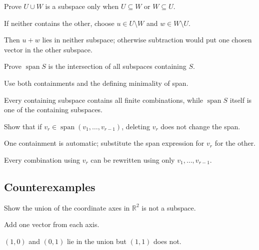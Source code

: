 \begin{exercise}\label{exr:i02-expand-07}
Prove \(U\cup W\) is a subspace only when \(U\subseteq W\) or \(W\subseteq U\).
\end{exercise}
\begin{hint}
If neither contains the other, choose \(u\in U\setminus W\) and \(w\in W\setminus U\).
\end{hint}
\begin{solution}
Then \(u+w\) lies in neither subspace; otherwise subtraction would put one chosen vector in the other subspace.
\end{solution}

\begin{exercise}\label{exr:i02-expand-08}
Prove \(\operatorname{span}S\) is the intersection of all subspaces containing \(S\).
\end{exercise}
\begin{hint}
Use both containments and the defining minimality of span.
\end{hint}
\begin{solution}
Every containing subspace contains all finite combinations, while \(\operatorname{span}S\) itself is one of the containing subspaces.
\end{solution}

\begin{exercise}\label{exr:i02-expand-09}
Show that if \(v_r\in\operatorname{span}(v_1,\ldots,v_{r-1})\), deleting \(v_r\) does not change the span.
\end{exercise}
\begin{hint}
One containment is automatic; substitute the span expression for \(v_r\) for the other.
\end{hint}
\begin{solution}
Every combination using \(v_r\) can be rewritten using only \(v_1,\ldots,v_{r-1}\).
\end{solution}

\subsection*{Counterexamples}

\begin{exercise}\label{exr:i02-expand-10}
Show the union of the coordinate axes in \(\mathbb R^2\) is not a subspace.
\end{exercise}
\begin{hint}
Add one vector from each axis.
\end{hint}
\begin{solution}
\((1,0)\) and \((0,1)\) lie in the union but \((1,1)\) does not.
\end{solution}

